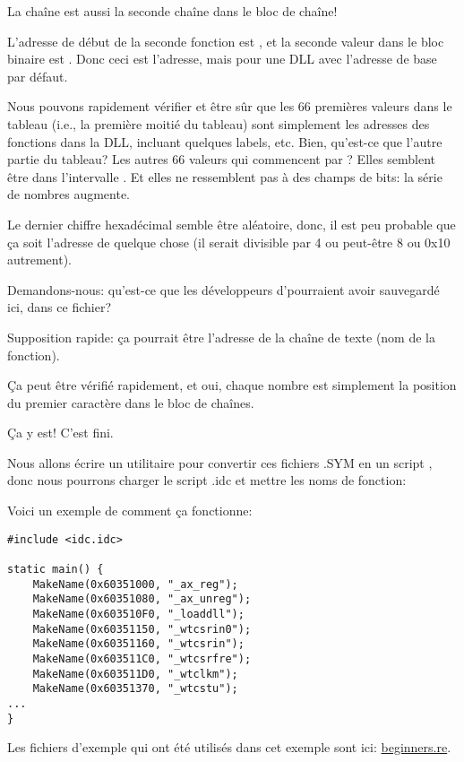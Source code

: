 La chaîne  est aussi la seconde chaîne dans le bloc de chaîne!

L'adresse de début de la seconde fonction est , et la seconde
valeur dans le bloc binaire est .
Donc ceci est l'adresse, mais pour une DLL avec l'adresse de base par défaut.

Nous pouvons rapidement vérifier et être sûr que les 66 premières valeurs dans
le tableau (i.e., la première moitié du tableau) sont simplement les adresses des
fonctions dans la DLL, incluant quelques labels, etc.
Bien, qu'est-ce que l'autre partie du tableau?
Les autres 66 valeurs qui commencent par ?
Elles semblent être dans l'intervalle \TT{[0...0x3F8]}.
Et elles ne ressemblent pas à des champs de bits:
la série de nombres augmente.

Le dernier chiffre hexadécimal semble être aléatoire, donc, il est peu probable
que ça soit l'adresse de quelque chose (il serait divisible par 4 ou peut-être
8 ou 0x10 autrement).

Demandons-nous: qu'est-ce que les développeurs d'\oracle pourraient avoir sauvegardé
ici, dans ce fichier?

Supposition rapide: ça pourrait être l'adresse de la chaîne de texte (nom de la
fonction).

Ça peut être vérifié rapidement, et oui, chaque nombre est simplement la position
du premier caractère dans le bloc de chaînes.

Ça y est! C'est fini.

Nous allons écrire un utilitaire pour convertir ces fichiers .SYM en un script
\IDA, donc nous pourrons charger le script .idc et mettre les noms de fonction:



Voici un exemple de comment ça fonctionne:

\begin{lstlisting}[style=customc]
#include <idc.idc>

static main() {
	MakeName(0x60351000, "_ax_reg");
	MakeName(0x60351080, "_ax_unreg");
	MakeName(0x603510F0, "_loaddll");
	MakeName(0x60351150, "_wtcsrin0");
	MakeName(0x60351160, "_wtcsrin");
	MakeName(0x603511C0, "_wtcsrfre");
	MakeName(0x603511D0, "_wtclkm");
	MakeName(0x60351370, "_wtcstu");
...
}
\end{lstlisting}

Les fichiers d'exemple qui ont été utilisés dans cet exemple sont ici:
\href{http://beginners.re/examples/oracle/SYM/}{beginners.re}.

